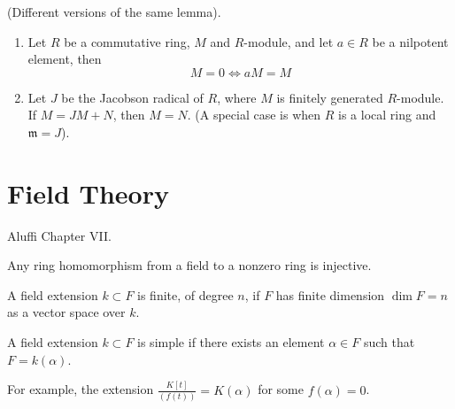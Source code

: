 \documentclass[openany]{book}
\begin{document}
\begin{prop}
    (Different versions of the same lemma).
    \begin{enumerate}
        \item Let $R$ be a commutative ring, $M$ and $R$-module, and let $a\in R$ be a nilpotent element, then
        \begin{equation*}
            M=0\iff aM=M
        \end{equation*}
        \item Let $J$ be the Jacobson radical of $R$, where $M$ is finitely generated $R$-module. If $M=JM+N$, then $M=N$. (A special case is when $R$ is a local ring and $\mathfrak{m}=J$).
    \end{enumerate}
\end{prop}













































\chapter{Field Theory}

Aluffi Chapter VII.


\begin{prop}
    Any ring homomorphism from a field to a nonzero ring is injective.
\end{prop}


\begin{defn}
    A field extension $k\subset F$ is finite, of degree $n$, if $F$ has finite dimension $\dim F=n$ as a vector space over $k$.
\end{defn}


\begin{defn}
    A field extension $k\subset F$ is simple if there exists an element $\alpha\in F$ such that $F=k(\alpha)$.

    For example, the extension $\frac{K[t]}{(f(t))}=K(\alpha)$ for some $f(\alpha)=0$. 
\end{defn}
\end{document}
